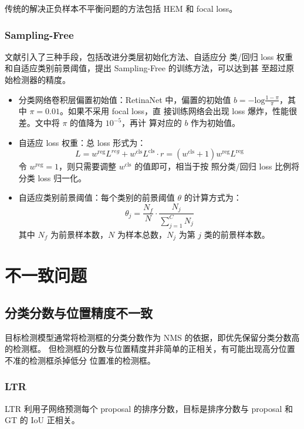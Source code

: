 传统的解决正负样本不平衡问题的方法包括 HEM 和 focal loss。

\subsubsection{Sampling-Free}
文献引入了三种手段，包括改进分类层初始化方法、自适应分
类/回归 loss 权重和自适应类别前景阈值，提出 Sampling-Free 的训练方法，可以达到甚
至超过原始检测器的精度。

\begin{itemize}
  \item 分类网络卷积层偏置初始值：RetinaNet 中，偏置的初始值 $b =
    -\mathrm{log}\frac{1-\pi}{\pi}$，其中 $\pi=0.01$。如果不采用 focal loss，直
    接训练网络会出现 loss 爆炸，性能很差。文中将 $\pi$ 的值降为 $10^{-5}$，再计
    算对应的 $b$ 作为初始值。
  \item 自适应 loss 权重：总 loss 形式为：
    \begin{equation}
    L = w^{\mathrm{reg}} L^{reg} +
    w^{\mathrm{cls}} L^{\mathrm{cls}} \cdot r = \left( w^{\mathrm{cls}} + 1
    \right) w^{\mathrm{reg}} L^{\mathrm{reg}}
    \end{equation}
    令 $w^{\mathrm{reg}} = 1$，则只需要调整 $w^{\mathrm{cls}}$ 的值即可，相当于按
    照分类/回归 loss 比例将分类 loss 归一化。
  \item 自适应类别前景阈值：每个类别的前景阈值 $\theta$ 的计算方式为：
    \begin{equation}
      \theta_j = \frac{N_f}{N} \cdot \frac{N_j}{\sum_{j=1}^{C} N_j}
    \end{equation}
    其中 $N_f$ 为前景样本数，$N$ 为样本总数，$N_j$ 为第 $j$ 类的前景样本数。
\end{itemize}

\section{不一致问题}
\subsection{分类分数与位置精度不一致}
目标检测模型通常将检测框的分类分数作为 NMS 的依据，即优先保留分类分数高的检测框。
但检测框的分数与位置精度并非简单的正相关，有可能出现高分位置不准的检测框杀掉低分
位置准的检测框。

\subsubsection{LTR}
LTR 利用子网络预测每个 proposal 的排序分数，目标是排序分数与 proposal 和 GT 的
IoU 正相关。

